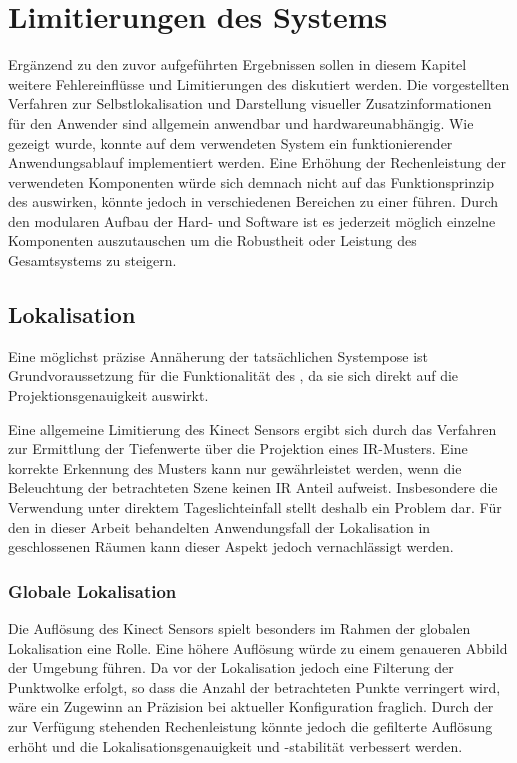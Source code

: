 \chapter{Limitierungen des Systems}


Ergänzend zu den zuvor aufgeführten Ergebnissen sollen in diesem Kapitel weitere Fehlereinflüsse und Limitierungen des  diskutiert werden. Die vorgestellten Verfahren zur Selbstlokalisation und Darstellung visueller Zusatzinformationen für den Anwender sind allgemein anwendbar und hardwareunabhängig. Wie gezeigt wurde, konnte auf dem verwendeten System ein funktionierender Anwendungsablauf implementiert werden. Eine Erhöhung der Rechenleistung der verwendeten Komponenten würde sich demnach nicht auf das Funktionsprinzip des  auswirken, könnte jedoch in verschiedenen Bereichen zu einer  führen. Durch den modularen Aufbau der Hard- und Software ist es jederzeit möglich einzelne Komponenten auszutauschen um die Robustheit oder Leistung des Gesamtsystems zu steigern.

\section{Lokalisation}
Eine möglichst präzise Annäherung der tatsächlichen Systempose ist Grundvoraussetzung für die Funktionalität des , da sie sich direkt auf die Projektionsgenauigkeit auswirkt.

Eine allgemeine Limitierung des Kinect Sensors ergibt sich durch das Verfahren zur Ermittlung der Tiefenwerte über die Projektion eines IR-Musters. Eine korrekte Erkennung des Musters kann nur gewährleistet werden, wenn die Beleuchtung der betrachteten Szene keinen \red[starken] IR Anteil aufweist. Insbesondere die Verwendung unter direktem Tageslichteinfall stellt deshalb ein Problem dar. Für den in dieser Arbeit behandelten Anwendungsfall der Lokalisation in geschlossenen Räumen kann dieser Aspekt jedoch vernachlässigt werden.

\subsection{Globale Lokalisation}
Die Auflösung des Kinect Sensors spielt besonders im Rahmen der globalen Lokalisation eine Rolle. Eine höhere Auflösung würde zu einem genaueren Abbild der Umgebung führen. Da vor der Lokalisation jedoch eine Filterung der Punktwolke erfolgt, so dass die Anzahl der betrachteten Punkte verringert wird, wäre ein Zugewinn an Präzision bei aktueller Konfiguration fraglich. Durch \red[Steigerung] der zur Verfügung stehenden Rechenleistung könnte jedoch die gefilterte Auflösung erhöht und die Lokalisationsgenauigkeit und -stabilität verbessert werden.\\

